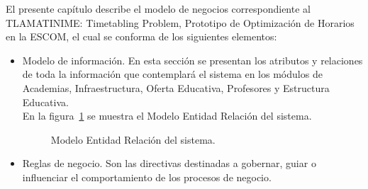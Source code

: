 
El presente capítulo describe el modelo de negocios correspondiente al TLAMATINIME: Timetabling Problem, Prototipo de Optimización de Horarios
en la ESCOM, el cual se conforma de los siguientes elementos:

\begin{itemize}
    \item Modelo de información. En esta sección se presentan los atributos y relaciones de toda la información que contemplará el sistema en los módulos de Academias, Infraestructura, Oferta Educativa, Profesores y Estructura Educativa. \\
    
    En la figura~\ref{fig:modeloER} se muestra el Modelo Entidad Relación del sistema.
    
    \begin{figure}[htbp!]
    	\begin{center}
    		\caption{Modelo Entidad Relación del sistema.}
    		\label{fig:modeloER}
    	\end{center}
    \end{figure}


    \item Reglas de negocio. Son las directivas destinadas a gobernar, guiar o influenciar el comportamiento de los procesos de negocio.
\end{itemize}

